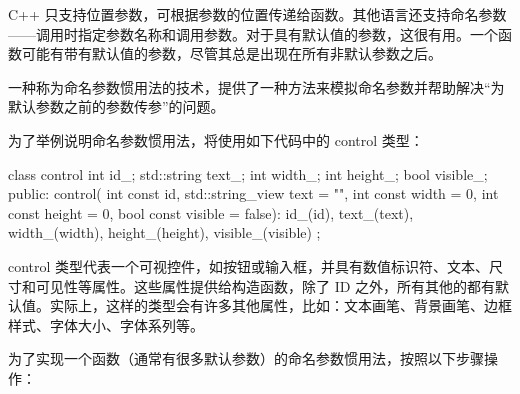 
C++ 只支持位置参数，可根据参数的位置传递给函数。其他语言还支持命名参数——调用时指定参数名称和调用参数。对于具有默认值的参数，这很有用。一个函数可能有带有默认值的参数，尽管其总是出现在所有非默认参数之后。

一种称为命名参数惯用法的技术，提供了一种方法来模拟命名参数并帮助解决“为默认参数之前的参数传参”的问题。


为了举例说明命名参数惯用法，将使用如下代码中的 control 类型：

\begin{cpp}
class control
{
    int id_;
    std::string text_;
    int width_;
    int height_;
    bool visible_;
public:
    control(
    int const id,
    std::string_view text = "",
    int const width = 0,
    int const height = 0,
    bool const visible = false):
        id_(id), text_(text),
        width_(width), height_(height),
        visible_(visible)
    {}
};
\end{cpp}

control 类型代表一个可视控件，如按钮或输入框，并具有数值标识符、文本、尺寸和可见性等属性。这些属性提供给构造函数，除了 ID 之外，所有其他的都有默认值。实际上，这样的类型会有许多其他属性，比如：文本画笔、背景画笔、边框样式、字体大小、字体系列等。


为了实现一个函数（通常有很多默认参数）的命名参数惯用法，按照以下步骤操作：

